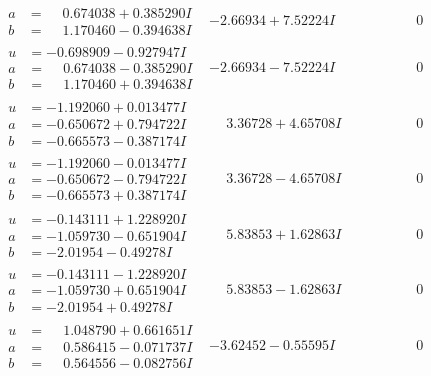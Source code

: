 \documentclass[1p]{elsarticle_modified}
\theoremstyle{definition}
\begin{document}
$$\begin{array}{c|c|c}
\begin{aligned}
a &= \phantom{-}0.674038 + 0.385290 I \\
b &= \phantom{-}1.170460 - 0.394638 I\end{aligned}
 & -2.66934 + 7.52224 I & \phantom{-0.000000 } 0 \\ \hline\begin{aligned}
u &= -0.698909 - 0.927947 I \\
a &= \phantom{-}0.674038 - 0.385290 I \\
b &= \phantom{-}1.170460 + 0.394638 I\end{aligned}
 & -2.66934 - 7.52224 I & \phantom{-0.000000 } 0 \\ \hline\begin{aligned}
u &= -1.192060 + 0.013477 I \\
a &= -0.650672 + 0.794722 I \\
b &= -0.665573 - 0.387174 I\end{aligned}
 & \phantom{-}3.36728 + 4.65708 I & \phantom{-0.000000 } 0 \\ \hline\begin{aligned}
u &= -1.192060 - 0.013477 I \\
a &= -0.650672 - 0.794722 I \\
b &= -0.665573 + 0.387174 I\end{aligned}
 & \phantom{-}3.36728 - 4.65708 I & \phantom{-0.000000 } 0 \\ \hline\begin{aligned}
u &= -0.143111 + 1.228920 I \\
a &= -1.059730 - 0.651904 I \\
b &= -2.01954 - 0.49278 I\end{aligned}
 & \phantom{-}5.83853 + 1.62863 I & \phantom{-0.000000 } 0 \\ \hline\begin{aligned}
u &= -0.143111 - 1.228920 I \\
a &= -1.059730 + 0.651904 I \\
b &= -2.01954 + 0.49278 I\end{aligned}
 & \phantom{-}5.83853 - 1.62863 I & \phantom{-0.000000 } 0 \\ \hline\begin{aligned}
u &= \phantom{-}1.048790 + 0.661651 I \\
a &= \phantom{-}0.586415 - 0.071737 I \\
b &= \phantom{-}0.564556 - 0.082756 I\end{aligned}
 & -3.62452 - 0.55595 I & \phantom{-0.000000 } 0 \\ \hline\begin{aligned}

\end{aligned}
\end{array}$$
\end{document}
